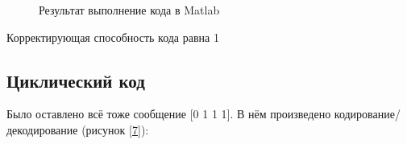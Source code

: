 \documentclass[a4paper,14pt]{extarticle}
\begin{document}
\begin{figure}[H]
\caption{Результат выполнение кода в Matlab}
\label{6}
\end{figure}

Корректирующая способность кода равна 1

\subsection{Циклический код}

Было оставлено всё тоже сообщение [0 1 1 1]. В нём произведено кодирование/декодирование (рисунок \ref{7}):
\end{document}
